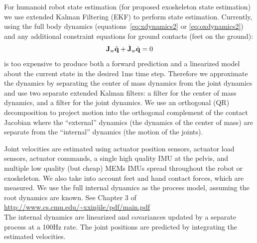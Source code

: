 \documentclass[letterpaper,12pt,fullpage]{article}
\begin{document}
For humanoid robot state estimation (for proposed exoskeleton state estimation)
we use extended Kalman Filtering (EKF) to perform state estimation.
Currently, using the full body dynamics 
(equations~\ref{eq:xdynamics2} or \ref{eq:oxdynamics2})
and any additional constraint equations for ground contacts (feet on the ground):
\begin{equation}
{\bf J}_w \ddot{{\bf q}} + \dot{{\bf J}}_w \dot{{\bf q}} = 0
\end{equation}
is too expensive to produce both a forward prediction and a linearized model
about the current state in the desired 1ms time step.
Therefore we approximate the dynamics by separating the center of mass dynamics
from the joint dynamics and use two separate extended Kalman filters:
a filter for the center of mass dynamics, and a filter for the joint dynamics.
We use an orthogonal (QR) decomposition to project motion into the orthogonal
complement of the contact Jacobian where the ``external'' dynamics (the dynamics
of the center of mass) are separate from the ``internal'' dynamics (the motion
of the joints).

Joint velocities are estimated using actuator position sensors, actuator load
sensors, actuator commands, a single high
quality IMU at the pelvis, and multiple low quality (but cheap) MEMs IMUs
spread throughout the robot or exoskeleton. We also take into account feet and hand
contact forces, which
are measured. We use the full internal dynamics as the process model,
assuming the root dynamics are known. See Chapter 3 of\\
\url{http://www.cs.cmu.edu/~xxinjile/pdf/main.pdf}\\
The internal dynamics are linearized and covariances updated
by a separate process at a 100Hz rate.
The joint positions are predicted by integrating the estimated velocities.
\end{document}
